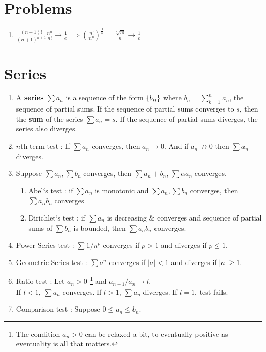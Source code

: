 \section*{Problems}
\begin{enumerate}
	\item $\frac{(n+1)!}{(n+1)^{n+1}} \frac{n^n}{n!} \to \frac{1}{e} \implies \left(\frac{n!}{n^n}\right)^\frac{1}{n} = \frac{\sqrt[n]{n!}}{n} \to \frac{1}{e}$
\end{enumerate}

\section{Series}
\begin{enumerate}
	\item A \textbf{series} $\sum a_n$ is a sequence of the form $\{b_n\}$ where $b_n = \sum_{k=1}^n a_n$, the sequence of partial sums. If the sequence of partial sums converges to $s$, then the \textbf{sum} of the series $\sum a_n = s$. If the sequence of partial sums diverges, the series also diverges.
	\item $n$th term test : If $\sum a_n$ converges, then $a_n \to 0$. And if $a_n \not\to 0$ then $\sum a_n$ diverges.
	\item Suppose $\sum a_n, \sum b_n$ converges, then $\sum a_n+b_n$, $\sum \alpha a_n$ converges.
		\begin{enumerate}
			\item Abel`s test : if $\sum a_n$ is monotonic and $\sum a_n,\sum b_n$ converges, then $\sum a_nb_n$ converges
			\item Dirichlet`s test : if $\sum a_n$ is decreasing \& converges and sequence of partial sums of $\sum b_n$ is bounded, then $\sum a_nb_n$ converges.
		\end{enumerate}
	\item Power Series test : $\sum 1/n^p$ converges if $p>1$ and diverges if $p \le 1$.
	\item Geometric Series test : $\sum a^n$ converges if $|a| < 1$ and diverges if $|a| \ge 1$.
	\item Ratio test : Let $a_n > 0$ \footnote{The condition $a_n > 0$ can be relaxed a bit, to eventually positive as eventuality is all that matters.} and $a_{n+1}/a_n \to l$.\\
		If $l<1$, $\sum a_n$ converges. If $l>1$, $\sum a_n$ diverges. If $l = 1$, test fails.
	\item Comparison test : Suppose $0 \le a_n \le b_n$.\\

\end{enumerate}
